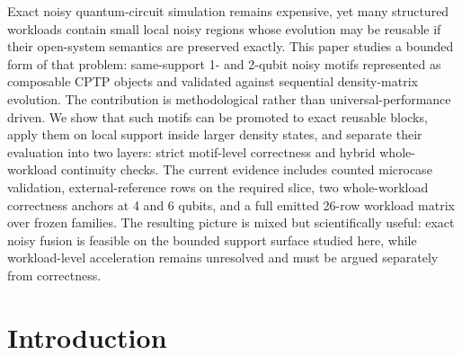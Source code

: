 




\begin{Abstract}
  Exact noisy quantum-circuit simulation remains expensive, yet many structured
  workloads contain small local noisy regions whose evolution may be reusable if
  their open-system semantics are preserved exactly. This paper studies a bounded
  form of that problem: same-support 1- and 2-qubit noisy motifs represented as
  composable CPTP objects and validated against sequential density-matrix
  evolution. The contribution is methodological rather than universal-performance
  driven. We show that such motifs can be promoted to exact reusable blocks,
  apply them on local support inside larger density states, and separate their
  evaluation into two layers: strict motif-level correctness and hybrid
  whole-workload continuity checks. The current evidence includes counted
  microcase validation, external-reference rows on the required slice, two
  whole-workload correctness anchors at 4 and 6 qubits, and a full emitted
  26-row workload matrix over frozen families. The resulting picture is mixed but
  scientifically useful: exact noisy fusion is feasible on the bounded support
  surface studied here, while workload-level acceleration remains unresolved and
  must be argued separately from correctness.
\end{Abstract}

\section{Introduction}

